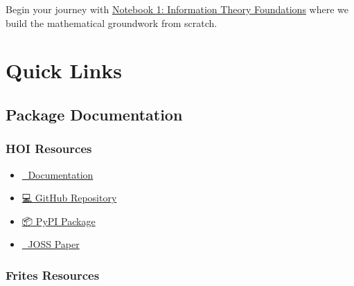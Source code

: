 \documentclass[
  11pt,
  letterpaper,
  oneside,
  openany]{book}
\providecommand{\tightlist}{%
  \setlength{\itemsep}{0pt}\setlength{\parskip}{0pt}}
\begin{document}
\begin{tcolorbox}[enhanced jigsaw, colbacktitle=quarto-callout-tip-color!10!white, colframe=quarto-callout-tip-color-frame, toprule=.15mm, toptitle=1mm, bottomtitle=1mm, leftrule=.75mm, titlerule=0mm, title=\textcolor{quarto-callout-tip-color}{\faLightbulb}\hspace{0.5em}{Ready to Start?}, arc=.35mm, rightrule=.15mm, opacityback=0, breakable, opacitybacktitle=0.6, bottomrule=.15mm, left=2mm, coltitle=black, colback=white]

Begin your journey with
\href{01_information_theory_foundations.ipynb}{Notebook 1: Information
Theory Foundations} where we build the mathematical groundwork from
scratch.

\end{tcolorbox}

\section*{Quick Links}\label{quick-links}


\subsection*{Package Documentation}\label{package-documentation}

\subsubsection*{HOI Resources}\label{hoi-resources}

\begin{itemize}
\tightlist
\item
  \href{https://brainets.github.io/hoi/}{📖 Documentation}
\item
  \href{https://github.com/brainets/hoi}{💻 GitHub Repository}
\item
  \href{https://pypi.org/project/hoi/}{📦 PyPI Package}
\item
  \href{https://doi.org/10.21105/joss.07360}{📄 JOSS Paper}
\end{itemize}

\subsubsection*{Frites Resources}\label{frites-resources}
\end{document}
